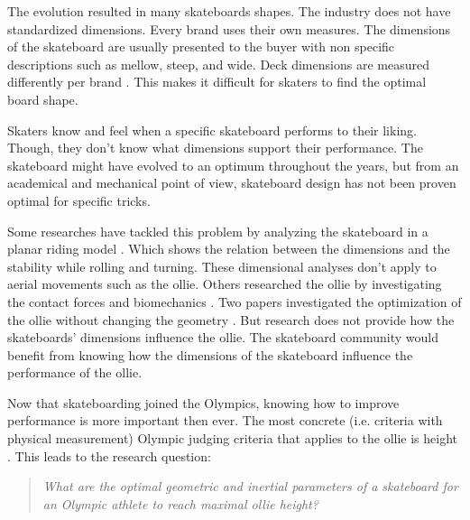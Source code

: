 \documentclass[default,iicol]{sn-jnl}
\theoremstyle{thmstyleone}%
\theoremstyle{thmstyletwo}%
\theoremstyle{thmstylethree}%
\begin{document}
The evolution resulted in many skateboards shapes. The industry does not have standardized dimensions. Every brand uses their own measures\cite{berger_handmade_2021}. The dimensions of the skateboard are usually presented to the buyer with non specific descriptions such as mellow, steep, and wide. Deck dimensions are measured differently per brand \cite{johnny_skateboarding_2013}. This makes it difficult for skaters to find the optimal board shape.

Skaters know and feel when a specific skateboard performs to their liking. Though, they don’t know what dimensions support their performance. The skateboard might have evolved to an optimum throughout the years, but from an academical and mechanical point of view, skateboard design has not been proven optimal for specific tricks.

Some researches have tackled this problem by analyzing the skateboard in a planar riding model \cite{hubbard_lateral_1979,hubbard_human_1980,kremnev_nonlinear_2010,ispolov_skateboard_1996,rosatello_skateboard_2015,varszegi_stability_2017,varszegi_stabilizing_2016,varszegi_downhill_2016,varszegi_balancing_2014,kuleshov_mathematical_2007,kuleshov_various_2010}. Which shows the relation between the dimensions and the stability while rolling and turning. These dimensional analyses don't apply to aerial movements such as the ollie. Others researched the ollie by investigating the contact forces \cite{anderson_ollie_2020,shield_contact-implicit_2022} and biomechanics \cite{frederick_biomechanics_2006,vorlicek_analysis_2015,wood_3d_2020,nakashima_simulation_2021,nevitt_ground_2006,candotti_lower_2012,dias_using_2016,anderson_ollie_2020,bridgman_human_1992,ou_postural_2021}. Two papers investigated the optimization of the ollie without changing the geometry \cite{anderson_ollie_2020,shield_contact-implicit_2022}. But research does not provide how the skateboards' dimensions influence the ollie. The skateboard community would benefit from knowing how the dimensions of the skateboard influence the performance of the ollie. 

Now that skateboarding joined the Olympics, knowing how to improve performance is more important then ever. The most concrete (i.e. criteria with physical measurement) Olympic judging criteria that applies to the ollie is height \cite{world_skate_skateboarding_2021}. This leads to the research question:
\begin{quote}
\textit{
    What are the optimal geometric and inertial parameters of a skateboard for an Olympic athlete to reach maximal ollie height?}
\end{quote}
\end{document}
